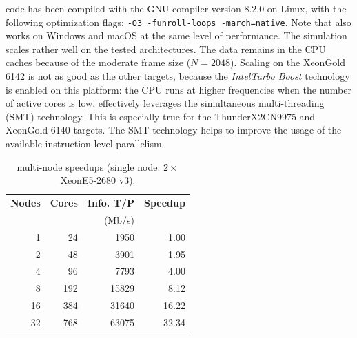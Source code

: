 code has been compiled with the \Cxx GNU compiler version 8.2.0 on Linux, with
the following optimization flags: \verb|-O3 -funroll-loops -march=native|. Note
that \AFFECT also works on Windows and macOS at the same level of performance.
The simulation scales rather well on the tested architectures. The data remains
in the CPU caches because of the moderate frame size ($N = 2048$). Scaling on
the Xeon\TM Gold 6142 is not as good as the other targets, because the
\textit{Intel\R Turbo Boost} technology is enabled on this platform: the CPU
runs at higher frequencies when the number of active cores is low. \AFFECT
effectively leverages the simultaneous multi-threading (SMT) technology. This is
especially true for the ThunderX2\R CN9975 and Xeon\TM Gold 6140 targets. The
SMT technology helps to improve the usage of the available instruction-level
parallelism.

\begin{table}
  \centering
  \caption{\AFFECT multi-node speedups (single node: $2\times$Xeon\TM E5-2680 v3).}
  \label{tab:simu_speedup_mpi}
  \begin{tabular}{r  r  r  r}
  \textbf{Nodes} & \textbf{Cores} & \textbf{Info. T/P} & \textbf{Speedup} \\
                 &                & (Mb/s)             &           \\
  \hline
  \hline
   1             &  24            &  1950              &  1.00     \\
   2             &  48            &  3901              &  1.95     \\
   4             &  96            &  7793              &  4.00     \\
   8             & 192            & 15829              &  8.12     \\
  16             & 384            & 31640              & 16.22     \\
  32             & 768            & 63075              & 32.34     \\
  \end{tabular}
\end{table}

